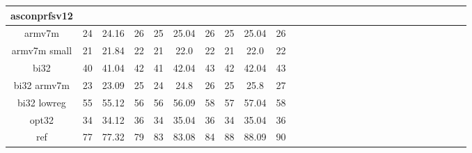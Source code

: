 \documentclass[12pt,a4paper,italian]{report}
\begin{document}
\begin{landscape}
\begin{table}[]
\begin{adjustbox}{width=600pt}
\begin{tabular}{|c|c|c|c|c|c|c|c|c|c|c|c|c|c|c|c|c|c|c|c|c|c|c|c|c|c|c|c|}
				\hline
                asconprfsv12 & & & & & & & & & & & & & & & & & & & & & & & & & & & \\
				\hline
				armv7m & 24 & 24.16 & 26 & 25 & 25.04 & 26 & 25 & 25.04 & 26 & & & & & & & & & & & & & & & & & & \\
				\hline
				armv7m small & 21 & 21.84 & 22 & 21 & 22.0 & 22 & 21 & 22.0 & 22 & & & & & & & & & & & & & & & & & & \\
				\hline
				bi32 & 40 & 41.04 & 42 & 41 & 42.04 & 43 & 42 & 42.04 & 43 & & & & & & & & & & & & & & & & & & \\
				\hline
				bi32 armv7m & 23 & 23.09 & 25 & 24 & 24.8 & 26 & 25 & 25.8 & 27 & & & & & & & & & & & & & & & & & & \\
				\hline
				bi32 lowreg & 55 & 55.12 & 56 & 56 & 56.09 & 58 & 57 & 57.04 & 58 & & & & & & & & & & & & & & & & & & \\
				\hline
				opt32 & 34 & 34.12 & 36 & 34 & 35.04 & 36 & 34 & 35.04 & 36 & & & & & & & & & & & & & & & & & & \\
				\hline
				ref & 77 & 77.32 & 79 & 83 & 83.08 & 84 & 88 & 88.09 & 90 & & & & & & & & & & & & & & & & & & \\
				\hline
			\end{tabular}
		\end{adjustbox}
	\end{table}
\end{landscape}
\end{document}

